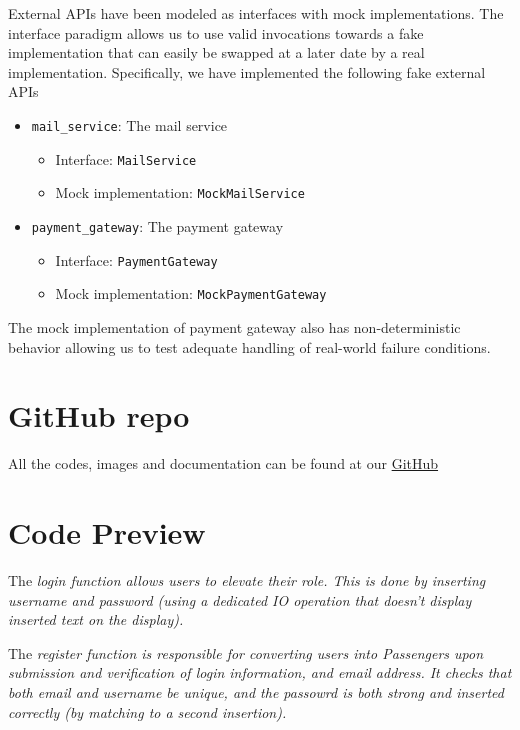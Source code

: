 External APIs have been modeled as interfaces with mock implementations.
The interface paradigm allows us to use valid invocations towards a fake implementation that can easily be swapped at a later date by a real implementation.
Specifically, we have implemented the following fake external APIs
\begin{itemize}
    \item \verb|mail_service|: The mail service
        \begin{itemize}
            \item Interface: \verb|MailService|
            \item Mock implementation: \verb|MockMailService|
        \end{itemize}
    \item \verb|payment_gateway|: The payment gateway
        \begin{itemize}
            \item Interface: \verb|PaymentGateway|
            \item Mock implementation: \verb|MockPaymentGateway|
        \end{itemize} 
\end{itemize}
The mock implementation of payment gateway also has non-deterministic behavior allowing us to test adequate handling of real-world failure conditions.

\section{GitHub repo}
All the codes, images and documentation can be found at our \href{https://github.com/DispatchNet/TRE/}{GitHub}

\section{Code Preview}

The \it{login} function allows  users to elevate their role. This is done by inserting username and password (using a dedicated IO operation that doesn't display inserted text on the display).

The \it{register} function is responsible for converting  users into \it{Passengers} upon submission and verification of login information, and email address.
It checks that both email and username be unique, and the passowrd is both strong and inserted correctly (by matching to a second insertion).

